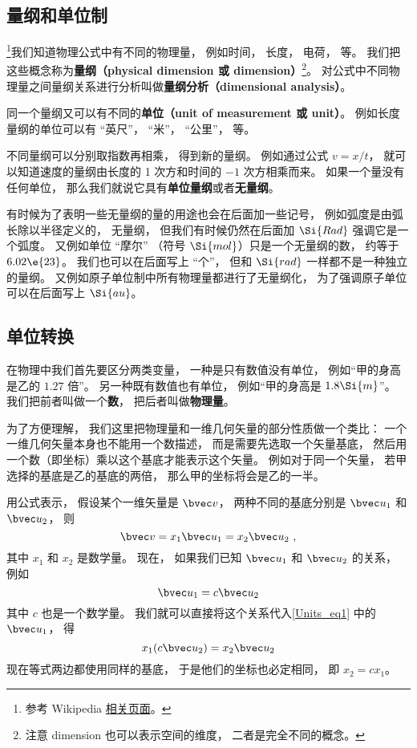 
\subsection{量纲和单位制}
\footnote{参考 Wikipedia \href{https://en.wikipedia.org/wiki/Dimensional_analysis}{相关页面}。}我们知道物理公式中有不同的物理量， 例如时间， 长度， 电荷， 等。 我们把这些概念称为\textbf{量纲（physical dimension 或 dimension）}\footnote{注意 dimension 也可以表示空间的维度， 二者是完全不同的概念。}。 对公式中不同物理量之间量纲关系进行分析叫做\textbf{量纲分析（dimensional analysis）}。

同一个量纲又可以有不同的\textbf{单位（unit of measurement 或 unit）}。 例如长度量纲的单位可以有 “英尺”， “米”， “公里”， 等。

不同量纲可以分别取指数再相乘， 得到新的量纲。 例如通过公式 $v = x/t$， 就可以知道速度的量纲由长度的 1 次方和时间的 $-1$ 次方相乘而来。 如果一个量没有任何单位， 那么我们就说它具有\textbf{单位量纲}或者\textbf{无量纲}。

有时候为了表明一些无量纲的量的用途也会在后面加一些记号， 例如弧度是由弧长除以半径定义的， 无量纲， 但我们有时候仍然在后面加 $\Si{Rad}$ 强调它是一个弧度。 又例如单位 “摩尔” （符号 $\Si{mol}$）只是一个无量纲的数， 约等于 $6.02\e{23}$。 我们也可以在后面写上 “个”， 但和 $\Si{rad}$ 一样都不是一种独立的量纲。 又例如原子单位制中所有物理量都进行了无量纲化， 为了强调原子单位可以在后面写上 $\Si{au}$。

\subsection{单位转换}


在物理中我们首先要区分两类变量， 一种是只有数值没有单位， 例如“甲的身高是乙的 $1.27$ 倍”。 另一种既有数值也有单位， 例如“甲的身高是 $1.8\Si{m}$”。 我们把前者叫做一个\textbf{数}， 把后者叫做\textbf{物理量}。

为了方便理解， 我们这里把物理量和一维几何矢量的部分性质做一个类比： 一个一维几何矢量本身也不能用一个数描述， 而是需要先选取一个矢量基底， 然后用一个数（即坐标）乘以这个基底才能表示这个矢量。 例如对于同一个矢量， 若甲选择的基底是乙的基底的两倍， 那么甲的坐标将会是乙的一半。

用公式表示， 假设某个一维矢量是 $\bvec v$， 两种不同的基底分别是 $\bvec u_1$ 和 $\bvec u_2$， 则
\begin{equation}\label{Units_eq1}
\bvec v = x_1 \bvec u_1 = x_2 \bvec u_2~,
\end{equation}
其中 $x_1$ 和 $x_2$ 是数学量。 现在， 如果我们已知 $\bvec u_1$ 和 $\bvec u_2$ 的关系， 例如
\begin{equation}\label{Units_eq2}
\bvec u_1 = c \bvec u_2
\end{equation}
其中 $c$ 也是一个数学量。 我们就可以直接将这个关系代入\autoref{Units_eq1} 中的 $\bvec u_1$， 得
\begin{equation}
x_1 (c \bvec u_2) = x_2 \bvec u_2
\end{equation}
现在等式两边都使用同样的基底， 于是他们的坐标也必定相同， 即 $x_2 = c x_1$。

